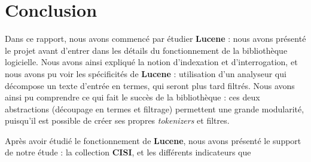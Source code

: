 \section*{Conclusion}

Dans ce rapport, nous avons commencé par étudier \textbf{Lucene} : nous avons présenté le projet avant d'entrer dans les détails du fonctionnement de la bibliothèque logicielle. Nous avons ainsi expliqué la notion d'indexation et d'interrogation, et nous avons pu voir les spécificités de \textbf{Lucene} : utilisation d'un analyseur qui décompose un texte d'entrée en termes, qui seront plus tard filtrés. Nous avons ainsi pu comprendre ce qui fait le succès de la bibliothèque : ces deux abstractions (découpage en termes et filtrage) permettent une grande modularité, puisqu'il est possible de créer ses propres \textit{tokenizers} et filtres.

Après avoir étudié le fonctionnement de \textbf{Lucene}, nous avons présenté le support de notre étude : la collection \textbf{CISI}, et les différents indicateurs que 

